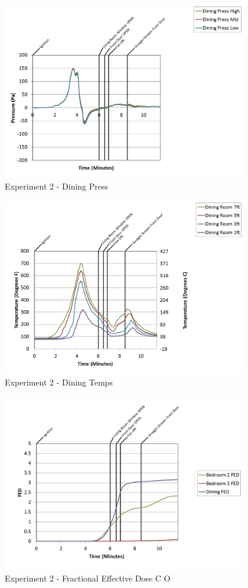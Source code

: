 \documentclass{article}
\begin{document}
\begin{appendices}
\begin{figure}[h!]
	\centering
	\includegraphics[height=3.05in]{0_Images/Results_Charts/Exp_2_Charts/DiningPress.png}
	\caption{Experiment 2 - Dining Press}
\end{figure}

\clearpage

\begin{figure}[h!]
	\centering
	\includegraphics[height=3.05in]{0_Images/Results_Charts/Exp_2_Charts/DiningTemps.png}
	\caption{Experiment 2 - Dining Temps}
\end{figure}


\begin{figure}[h!]
	\centering
	\includegraphics[height=3.05in]{0_Images/Results_Charts/Exp_2_Charts/FractionalEffectiveDoseCO.png}
	\caption{Experiment 2 - Fractional Effective Dose C O}
\end{figure}


\end{appendices}
\end{document}
